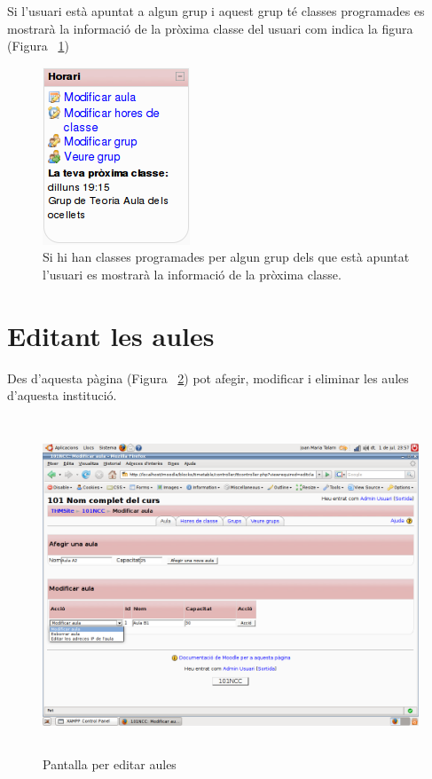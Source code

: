 \documentclass[a4paper]{report}  %
\begin{document}
Si l'usuari està apuntat a algun grup i aquest grup té classes programades es mostrarà la informació de la pròxima classe del usuari com indica la figura (Figura ~\ref{fig:BlocIniciNextClass})
\begin{figure}[H] %
\begin{center}
\includegraphics{img/BlocIniciNextClass.png}
\caption[List caption]{Si hi han classes programades per algun grup dels que està apuntat l'usuari es mostrarà la informació de la pròxima classe.}
\label{fig:BlocIniciNextClass}
\end{center}
\end{figure}

\section{Editant les aules}
Des d'aquesta pàgina (Figura ~\ref{fig:EditantAules}) pot afegir, modificar i eliminar les aules d'aquesta institució.
\begin{figure}[H] %
\begin{center}
\includegraphics[height=10cm,width=12cm]{img/EditantAules.png}
\caption[List caption]{Pantalla per editar aules}
\label{fig:EditantAules}
\end{center}
\end{figure}
\end{document}
